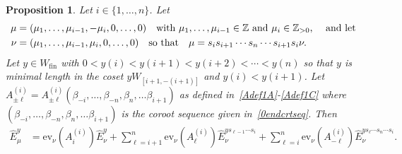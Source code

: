 \documentclass[11pt]{article}
\theoremstyle{plain}
\newtheorem*{prop*}{Proposition}
\theoremstyle{definition}
\theoremstyle{remark}
\numberwithin{equation}{section}
\def\ZZ{\mathbb{Z}}
\def\ev{\mathrm{ev}}
\newcounter{r}
\newcounter{s}
\begin{document}
\begin{prop*} 
Let $i\in \{1, \ldots, n\}$. Let 
\begin{align*}
\mu &= (\mu_1, \ldots, \mu_{i-1}, -\mu_i, 0, \ldots, 0)
\quad\hbox{with $\mu_1,\ldots, \mu_{i-1} \in \ZZ$ and $\mu_i \in \ZZ_{>0}$, \quad and let} \\
\nu &= (\mu_1, \ldots, \mu_{i-1}, \mu_i, 0, \ldots, 0)
\quad\hbox{so that}\quad
\mu = s_is_{i+1}\cdots s_n \cdots s_{i+1}s_i\nu.
\end{align*}
Let $y\in W_{\mathrm{fin}}$ with $0 < y(i) < y(i+1) < y(i+2) < \cdots < y(n)$ so that $y$ is minimal length in the coset $yW_{[i+1,-(i+1)]}$
and $y(i)<y(i+1)$.
Let $A^{(i)}_{\pm\ell}= A^{(i)}_{\pm\ell}(\beta_{-i}, \ldots, \beta_{-n}, \beta_n, \ldots \beta_{i+1})$ as defined in~\eqref{Adef1A}-\eqref{Adef1C}
where $(\beta_{-i}, \ldots, \beta_{-n}, \beta_n, \ldots \beta_{i+1})$ is the coroot sequence given in~\eqref{0endcrtseq}.
Then
\begin{align*}
\widehat{E}^y_\mu
&= 
\ev_\nu(A^{(i)}_{i})\widehat{E}_\nu^{y}
+
\sum_{\ell=i+1}^n \ev_\nu(A^{(i)}_{\ell})\widehat{E}_\nu^{ys_{\ell-1}\cdots s_i}
+
\sum_{\ell=i}^n \ev_\nu(A^{(i)}_{-\ell})\widehat{E}_\nu^{ys_\ell\cdots s_n\cdots s_i}.
\end{align*}
\end{prop*}
\end{document}
